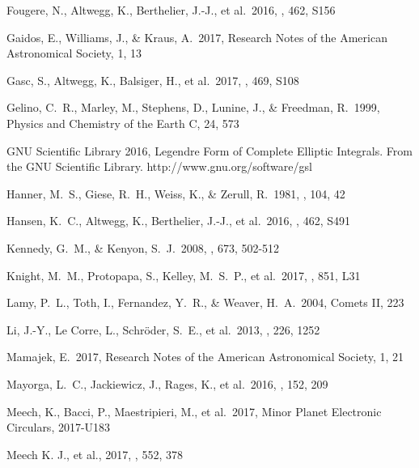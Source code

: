 \documentclass[a4paper,fleqn,usenatbib]{mnras}
\begin{document}
\begin{thebibliography}{99}
 Fougere, N., Altwegg, K., Berthelier, J.-J., et al.\ 2016, \mnras, 462, S156 

 Gaidos, E., Williams, J., \& Kraus, A.\ 2017, Research Notes of the American Astronomical Society, 1, 13

 Gasc, S., Altwegg, K., Balsiger, H., et al.\ 2017, \mnras, 469, S108 

 Gelino, C.~R., Marley, M., Stephens, D., Lunine, J., \& Freedman, R.\ 1999, Physics and Chemistry of the Earth C, 24, 573 

 GNU Scientific Library 2016, Legendre Form of Complete Elliptic Integrals. From the GNU Scientific Library. http://www.gnu.org/software/gsl

 Hanner, M.~S., Giese, R.~H., Weiss, K., \& Zerull, R.\ 1981, \aap, 104, 42 

 Hansen, K.~C., Altwegg, K., Berthelier, J.-J., et al.\ 2016, \mnras, 462, S491 

 Kennedy, G.~M., \& Kenyon, S.~J.\ 2008, \apj, 673, 502-512 

 Knight, M.~M., Protopapa, S., Kelley, M.~S.~P., et al.\ 2017, \apjl, 851, L31 

 Lamy, P.~L., Toth, I., Fernandez, Y.~R., \& Weaver, H.~A.\ 2004, Comets II, 223 

 Li, J.-Y., Le Corre, L., Schr{\"o}der, S.~E., et al.\ 2013, \icarus, 226, 1252 

 Mamajek, E.\ 2017, Research Notes of the American Astronomical Society, 1, 21 

 Mayorga, L.~C., Jackiewicz, J., Rages, K., et al.\ 2016, \aj, 152, 209 

 Meech, K., Bacci, P., Maestripieri, M., et al.\ 2017, Minor Planet Electronic Circulars, 2017-U183

 Meech K. J., et al., 2017, \nat, 552, 378


\end{thebibliography}
\end{document}
